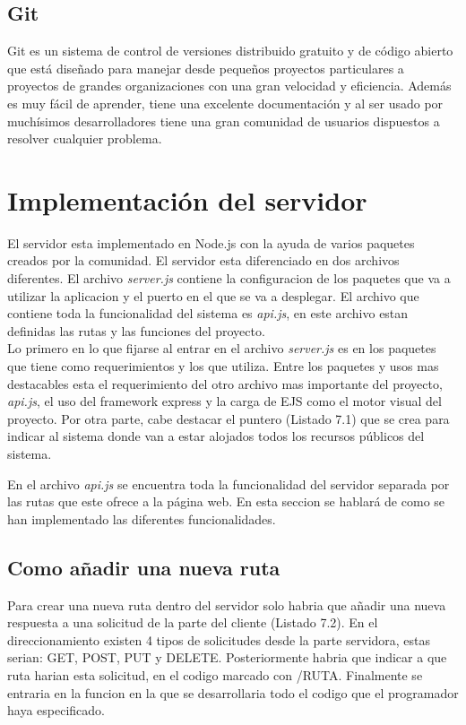 \subsection{Git}
Git\cite{git} es un sistema de control de versiones distribuido gratuito y de código abierto que está diseñado para manejar desde pequeños proyectos particulares a proyectos de grandes organizaciones con una gran velocidad y eficiencia. Además es muy fácil de aprender, tiene una excelente documentación y al ser usado por muchísimos desarrolladores tiene una gran comunidad de usuarios dispuestos a resolver cualquier problema.

\section{Implementación del servidor}
El servidor esta implementado en Node.js con la ayuda de varios paquetes creados por la comunidad. El servidor esta diferenciado en dos archivos diferentes. El archivo \textit{server.js} contiene la configuracion de los paquetes que va a utilizar la aplicacion y el puerto en el que se va a desplegar. El archivo que contiene toda la funcionalidad del sistema es \textit{api.js}, en este archivo estan definidas las rutas y las funciones del proyecto.\\

Lo primero en lo que fijarse al entrar en el archivo \textit{server.js} es en los paquetes que tiene como requerimientos y los que utiliza. Entre los paquetes y usos mas destacables esta el requerimiento del otro archivo mas importante del proyecto, \textit{api.js}, el uso del framework express y la carga de EJS como el motor visual del proyecto. Por otra parte, cabe destacar el puntero (Listado 7.1) que se crea para indicar al sistema donde van a estar alojados todos los recursos públicos del sistema.\\


En el archivo \textit{api.js} se encuentra toda la funcionalidad del servidor separada por las rutas que este ofrece a la página web. En esta seccion se hablará de como se han implementado las diferentes funcionalidades.

\subsection{Como añadir una nueva ruta}
Para crear una nueva ruta dentro del servidor solo habria que añadir una nueva respuesta a una solicitud de la parte del cliente (Listado 7.2). En el direccionamiento existen 4 tipos de solicitudes desde la parte servidora, estas serian: GET, POST, PUT y DELETE. Posteriormente habria que indicar a que ruta harian esta solicitud, en el codigo marcado con /RUTA. Finalmente se entraria en la funcion en la que se desarrollaria todo el codigo que el programador haya especificado.\\ 

